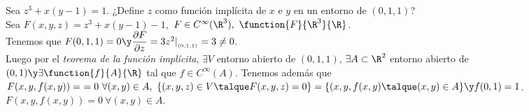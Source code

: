 \begin{ejem} Sea $z^3+x(y-1)=1$. ¿Define $z$ como función implícita de $x$ e $y$ en un entorno de $(0,1,1)$?\\
Sea $F(x,y,z)=z^3+x(y-1)-1$,\ $F\in C^\infty(\R^3),\ \function{F}{\R^3}{\R}$.\\
Tenemos que $F(0,1,1)=0\y\dfrac{\partial F}{\partial z}=3z^2|_{_{(0,1,1)}}=3\neq 0$.\\
Luego por el \textit{teorema de la función implícita}, $\exists V$ entorno abierto de $(0,1,1)$, $\exists A\subset\R^2$ entorno abierto de $(0,1)\y\exists\function{f}{A}{\R}$ tal que $f\in C^\infty(A)$. Tenemos además que $F(x,y,f(x,y))=\ =0\ \forall (x,y)\in A,\ \{(x,y,z)\in V\talque F(x,y,z)=0\}=\{(x,y,f(x,y)\talque(x,y)\in A\}\y f(0,1)=1$.\\
$F(x,y,f(x,y))=0\ \forall(x,y)\in A$.
\end{ejem}